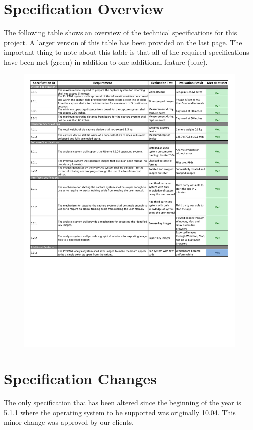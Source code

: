 \documentclass[]{article}
\begin{document}
	\section*{Specification Overview}
		The following table shows an overview of the technical specifications for this project. A larger version of this table has been provided on the last page. The important thing to note about this table is that all of the required specifications have been met (green) in addition to one additional feature (blue).\\
		\begin{figure}[h!]
			\centering
			\includegraphics[scale=0.5]{technicalspecificationreview.pdf}
		\end{figure}
		
	\section*{Specification Changes}
		The only specification that has been altered since the beginning of the year is 5.1.1 where the operating system to be supported was originally 10.04. This minor change was approved by our clients. 
		
\end{document}
